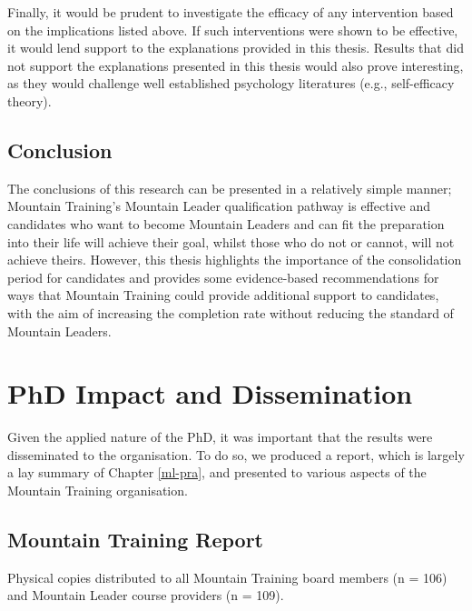 \documentclass[
  12pt,
  a4paper,
]{book}
\begin{document}
Finally, it would be prudent to investigate the efficacy of any intervention based on the implications listed above. If such interventions were shown to be effective, it would lend support to the explanations provided in this thesis. Results that did not support the explanations presented in this thesis would also prove interesting, as they would challenge well established psychology literatures (e.g., self-efficacy theory).

\hypertarget{general-discussion-conclusion}{%
\section{Conclusion}\label{general-discussion-conclusion}}

The conclusions of this research can be presented in a relatively simple manner; Mountain Training's Mountain Leader qualification pathway is effective and candidates who want to become Mountain Leaders and can fit the preparation into their life will achieve their goal, whilst those who do not or cannot, will not achieve theirs. However, this thesis highlights the importance of the consolidation period for candidates and provides some evidence-based recommendations for ways that Mountain Training could provide additional support to candidates, with the aim of increasing the completion rate without reducing the standard of Mountain Leaders.

\hypertarget{impact-activities}{%
\chapter{PhD Impact and Dissemination}\label{impact-activities}}

Given the applied nature of the PhD, it was important that the results were disseminated to the organisation. To do so, we produced a report, which is largely a lay summary of Chapter \ref{ml-pra}, and presented to various aspects of the Mountain Training organisation.

\hypertarget{mountain-training-report}{%
\section{Mountain Training Report}\label{mountain-training-report}}

Physical copies distributed to all Mountain Training board members (n = 106) and Mountain Leader course providers (n = 109).


\end{document}
